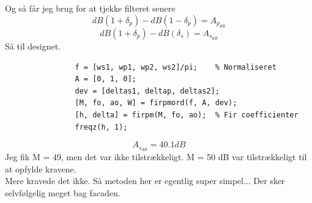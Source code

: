 \begin{Øvelser}
\begin{kapitel}
\begin{Øvelse}
            Og så får jeg brug for at tjekke filteret senere
            \[dB(1 + \delta_p) - dB(1 - \delta_p) = A_{p_{dB}}\]
            \[dB(1 + \delta_p) - dB(\delta_s) = A_{s_{dB}}\]
            Så til designet. 
            \begin{verbatim}
                f = [ws1, wp1, wp2, ws2]/pi;    % Normaliseret
                A = [0, 1, 0]; 
                dev = [deltas1, deltap, deltas2];
                [M, fo, ao, W] = firpmord(f, A, dev); 
                [h, delta] = firpm(M, fo, ao);  % Fir coefficienter
                freqz(h, 1);
            \end{verbatim}
            \[A_{s_{dB}} = 40.1dB\]
            Jeg fik M = 49, men det var ikke tilstrækkeligt. 
            M = 50 dB var tilstrækkeligt til at opfylde kravene. 
            \\
            Mere kravede det ikke. Så metoden her er egentlig super simpel... Der sker selvfølgelig meget bag facaden. 






            
        \end{Øvelse}      
    \end{kapitel}  
\end{Øvelser}
